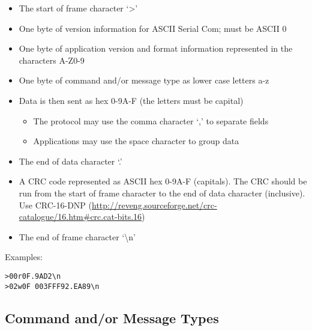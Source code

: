 \documentclass{customdocclass}
\begin{document}
\begin{itemize}
  \item The start of frame character `>'
  \item One byte of version information for ASCII Serial Com; must be ASCII 0
  \item One byte of application version and format information represented in the characters A-Z0-9
  \item One byte of command and/or message type as lower case letters a-z
  \item Data is then sent as hex 0-9A-F (the letters must be capital)
  \begin{itemize}
    \item The protocol may use the comma character `,' to separate fields
    \item Applications may use the space character to group data
  \end{itemize}
  \item The end of data character `.'
  \item A CRC code represented as ASCII hex 0-9A-F (capitals). The CRC should be run from the start of frame character to the end of data character (inclusive). Use CRC-16-DNP (\url{http://reveng.sourceforge.net/crc-catalogue/16.htm\#crc.cat-bits.16})
  \item The end of frame character `\textbackslash n'
\end{itemize}

Examples:

\begin{lstlisting}
>00r0F.9AD2\n
>02w0F 003FFF92.EA89\n
\end{lstlisting}

\subsection{Command and/or Message Types}
\end{document}
